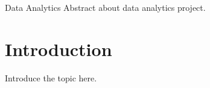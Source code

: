 \documentclass[12pt]{article}
\begin{document}
	
	\begin{cover}{Data Analytics}
	Abstract about data analytics project.
	\end{cover}

\section{Introduction}
	Introduce the topic here.
\end{document}
